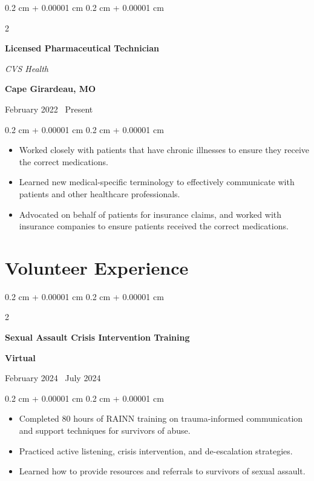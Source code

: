 \documentclass[10pt, letterpaper]{article}
\newenvironment{highlights}{
    \begin{itemize}[
        topsep=0.10 cm,
        parsep=0.10 cm,
        partopsep=0pt,
        itemsep=0pt,
        leftmargin=0.4 cm + 10pt
    ]
}{
    \end{itemize}
} %
\newenvironment{onecolentry}{
    \begin{adjustwidth}{
        0.2 cm + 0.00001 cm
    }{
        0.2 cm + 0.00001 cm
    }
}{
    \end{adjustwidth}
} %
\newenvironment{twocolentry}[2][]{
    \onecolentry
    \def\secondColumn{#2}
    \setcolumnwidth{\fill, 4.5 cm}
    \begin{paracol}{2}
}{
    \switchcolumn \raggedleft \secondColumn
    \end{paracol}
    \endonecolentry
} %
\let\hrefWithoutArrow\href
\renewcommand{\href}[2]{\hrefWithoutArrow{#1}{\ifthenelse{\equal{#2}{}}{ }{#2 }\raisebox{.15ex}{\footnotesize \faExternalLink*}}}
\begin{document}
\begin{samepage}

    \begin{twocolentry}{
            \textbf{Cape Girardeau, MO}

            February 2022 \textendash\ Present}
        \textbf{Licensed Pharmaceutical Technician}

        \textit{CVS Health}
    \end{twocolentry}

    \vspace{0.10 cm}
    \begin{onecolentry}
        \begin{highlights}
            \item Worked closely with patients that have chronic illnesses to ensure they receive the correct medications.
            \item Learned new medical-specific terminology to effectively communicate with patients and other healthcare professionals.
            \item Advocated on behalf of patients for insurance claims, and worked with insurance companies to ensure patients received the correct medications.
        \end{highlights}
    \end{onecolentry}
\end{samepage}

\section{Volunteer Experience}

\begin{twocolentry}{
        \textbf{Virtual}

        February 2024 \textendash\ July 2024
    }
    \textbf{Sexual Assault Crisis Intervention Training}

    \textit{\href{https://rainn.org/}{RAINN}}


    \vspace{0.10 cm}

\end{twocolentry}

\begin{onecolentry}
    \begin{highlights}
        \item  Completed 80 hours of RAINN training on trauma-informed communication and support techniques for survivors of abuse.
        \item Practiced active listening, crisis intervention, and de-escalation strategies.
        \item Learned how to provide resources and referrals to survivors of sexual assault.
    \end{highlights}
\end{onecolentry}
\end{document}
